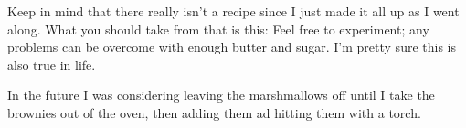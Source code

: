 \begin{experiments}
\item Keep in mind that there really isn't a recipe since I just made it all up as I went along. What you should take from that is this: Feel free to experiment; any problems can be overcome with enough butter and sugar. I'm pretty sure this is also true in life.

\item In the future I was considering leaving the marshmallows off until I take the brownies out of the oven, then adding them ad hitting them with a torch.
\end{experiments}


\recipeend%

